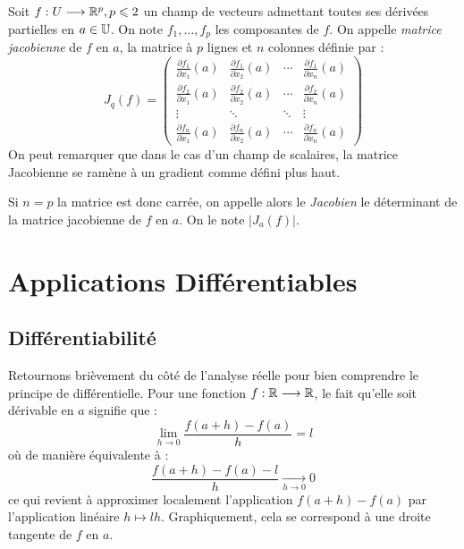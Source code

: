 \begin{definition}
    Soit $f : U \longrightarrow \mathbb{R}^p, p \leqslant 2$ un champ de vecteurs admettant toutes ses dérivées partielles en $ a \in \mathbb{U}$. 
    On note $f_1, \dots, f_p$ les composantes de $f$. 
    On appelle \emph{matrice jacobienne} de $f$ en $a$, la matrice à $p$ lignes et $n$ colonnes définie par : 
        \[ J_q(f) = 
            \begin{pmatrix}
                \frac{\partial f_1}{\partial x_1}(a) & \frac{\partial f_1}{\partial x_2}(a) & \cdots & \frac{\partial f_1}{\partial x_n}(a) \\ 
                \frac{\partial f_2}{\partial x_1}(a) & \frac{\partial f_2}{\partial x_2}(a) & \cdots & \frac{\partial f_2}{\partial x_n}(a) \\ 
                \vdots & \ddots & \ddots & \vdots \\ 
                \frac{\partial f_n}{\partial x_1}(a) & \frac{\partial f_n}{\partial x_2}(a) &  \cdots & \frac{\partial f_n}{\partial x_n}(a)
            \end{pmatrix} \] 
    On peut remarquer que dans le cas d'un champ de scalaires, la matrice Jacobienne se ramène à un gradient comme défini 
    plus haut. 

    Si $n = p$ la matrice est donc carrée, on appelle alors le \emph{Jacobien} le déterminant de la matrice jacobienne 
    de $f$ en $a$. On le note $|J_a(f)|$.  
\end{definition}


\section{Applications Différentiables}

\subsection{Différentiabilité}

Retournons brièvement du côté de l'analyse réelle pour bien comprendre le principe de différentielle. 
Pour une fonction $ f : \mathbb{R} \longrightarrow \mathbb{R}$, le fait qu'elle soit dérivable en $a$ signifie que : 
    \[ \underset{h \to 0}{\lim} \frac{f(a + h) - f(a)}{h} = l \]
où de manière équivalente à :
    \[ \frac{f(a + h) - f(a) - l}{h} \underset{h \to 0}{\longrightarrow} 0 \] 
ce qui revient à approximer localement l'application $f(a + h) - f(a)$ par l'application linéaire $ h \longmapsto lh$.
Graphiquement, cela se correspond à une droite tangente de $f$ en $a$. 


